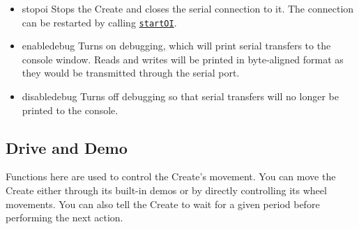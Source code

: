 \documentclass {article}
\begin{document}
\begin {itemize}
  \item {} {stopoi}
         Stops the Create and closes the serial connection to it.  The connection can be restarted
         by calling \hyperlink {startoi}{{\tt startOI}}. \\
         \retnorm

   \item {} {enabledebug}
         Turns on debugging, which will print serial transfers to the console window.  Reads
         and writes will be printed in byte-aligned format as they would be transmitted through the
         serial port.

   \item {} {disabledebug}
         Turns off debugging so that serial transfers will no longer be printed to the console.
\end {itemize}

\subsection {Drive and Demo}
Functions here are used to control the Create's movement.  You can move the Create either through
its built-in demos or by directly controlling its wheel movements.  You can also tell the Create to
wait for a given period before performing the next action.
\end{document}
